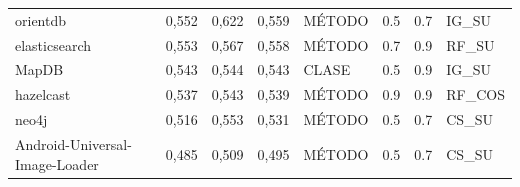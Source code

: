 \begin{table}[H]
{\begin{tabular}{llllllll}
orientdb                       & 0,552              & 0,622           & 0,559             & MÉTODO         & 0.5           & 0.7        & IG\_SU                  \\
elasticsearch                  & 0,553              & 0,567           & 0,558             & MÉTODO         & 0.7           & 0.9        & RF\_SU                  \\
MapDB                          & 0,543              & 0,544           & 0,543             & CLASE          & 0.5           & 0.9        & IG\_SU                  \\
hazelcast                      & 0,537              & 0,543           & 0,539             & MÉTODO         & 0.9           & 0.9        & RF\_COS                 \\
neo4j                          & 0,516              & 0,553           & 0,531             & MÉTODO         & 0.5           & 0.7        & CS\_SU                  \\
Android-Universal-Image-Loader & 0,485              & 0,509           & 0,495             & MÉTODO         & 0.5           & 0.7        & CS\_SU                 
\end{tabular}
}
\end{table}